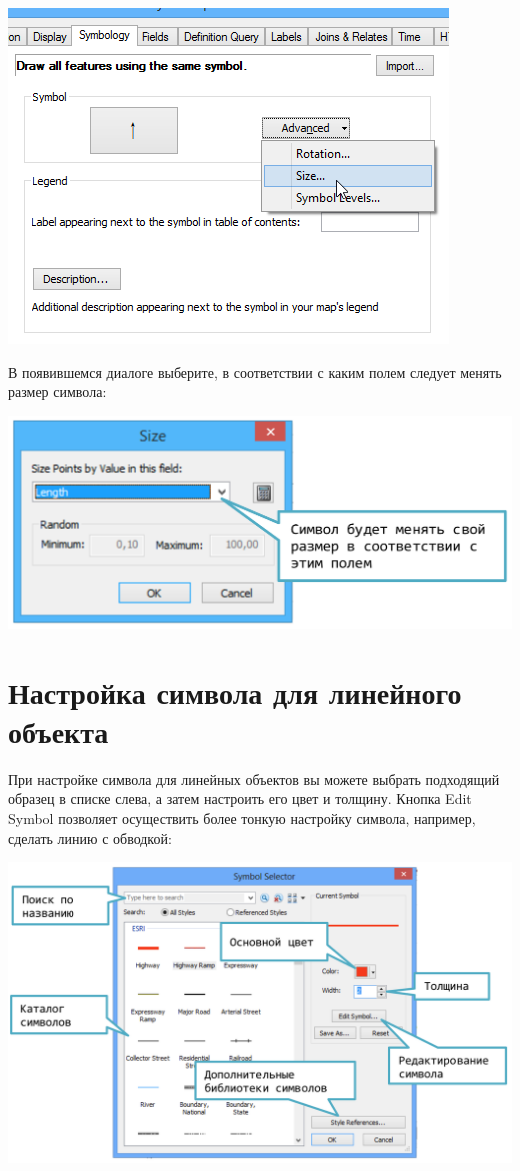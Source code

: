 \documentclass[]{book}
\theoremstyle{definition}
\theoremstyle{definition}
\theoremstyle{definition}
\theoremstyle{remark}
\begin{document}
\includegraphics{images/Appendix/image29.png}

В появившемся диалоге выберите, в соответствии с каким полем следует
менять размер символа:

\includegraphics{images/Appendix/image30.png}

\hypertarget{----}{%
\section{Настройка символа для линейного объекта}\label{----}}

При настройке символа для линейных объектов вы можете выбрать подходящий
образец в списке слева, а затем настроить его цвет и толщину. Кнопка
Edit Symbol позволяет осуществить более тонкую настройку символа,
например, сделать линию с обводкой:

\includegraphics{images/Appendix/image31.png}
\end{document}
